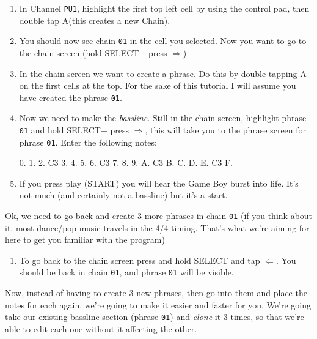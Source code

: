 \documentclass[]{article}
\newcommand{\buttonStyle}[1]{\textsf{#1}\xspace}
\newcommand{\buttonSymbolStyle}[1]{$\bm{#1}$\xspace}
\newcommand{\bA}{\buttonStyle{A}}
\newcommand{\bStart}{\buttonStyle{{START}}}
\newcommand{\bSelect}{\buttonStyle{{SELECT}}}
\newcommand{\bRight}{\buttonSymbolStyle{\Rightarrow}}
\newcommand{\bLeft}{\buttonSymbolStyle{\Leftarrow}}
\newcommand{\nb}[1]{\texttt{#1}\xspace}
\begin{document}
\begin{enumerate}

\item In Channel \nb{PU1}, highlight the first top left cell by using the control pad, then double tap \bA (this creates a new Chain).

\item You should now see chain \nb{01} in the cell you selected. Now you want to go to the chain screen (hold \bSelect + press \bRight)

\item In the chain screen we want to create a phrase. Do this by double tapping \bA on the first cells at the top. For the sake of this tutorial I will assume you have created the phrase \nb{01}.

\item Now we need to make the \textit{bassline}. Still in the chain screen, highlight phrase \nb{01} and hold \bSelect + press \bRight, this will take you to the phrase screen for phrase \nb{01}. Enter the following notes:
\begin{notes}
0.
1.
2. C3
3.
4.
5.
6. C3
7.
8.
9.
A. C3
B.
C.
D.
E. C3
F.
\end{notes}

\item If you press play (\bStart) you will hear the Game Boy burst into life. It's not much (and certainly not a bassline) but it's a start.

\end{enumerate}

Ok, we need to go back and create 3 more phrases in chain \nb{01} (if you think about it, most dance/pop music travels in the 4/4 timing. That's what we're aiming for here to get you familiar with the program) %

\begin{enumerate}[resume]


\item To go back to the chain screen press and hold \bSelect and tap \bLeft. You should be back in chain \nb{01}, and phrase \nb{01} will be visible.

\end{enumerate}

Now, instead of having to create 3 new phrases, then go into them and place the notes for each again, we're going to make it easier and faster for you. We're going take our existing bassline section (phrase \nb{01}) and \textit{clone} it 3 times, so that we're able to edit each one without it affecting the other. 
\end{document}
